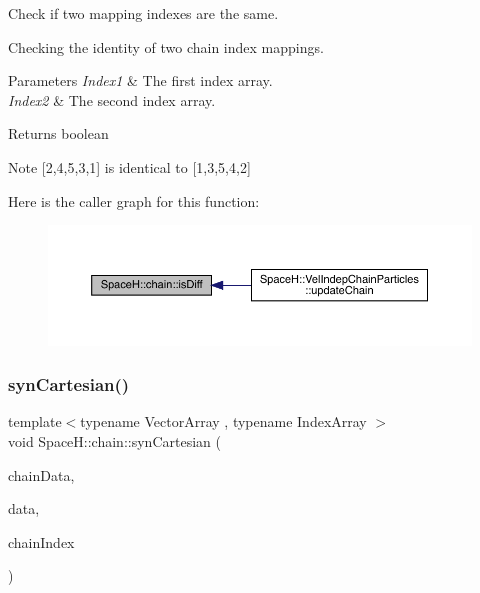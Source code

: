 Check if two mapping indexes are the same. 

Checking the identity of two chain index mappings. 
\begin{DoxyParams}{Parameters}
{\em Index1} & The first index array. \\
\hline
{\em Index2} & The second index array. \\
\hline
\end{DoxyParams}
\begin{DoxyReturn}{Returns}
boolean 
\end{DoxyReturn}
\begin{DoxyNote}{Note}
\mbox{[}2,4,5,3,1\mbox{]} is identical to \mbox{[}1,3,5,4,2\mbox{]} 
\end{DoxyNote}
Here is the caller graph for this function\+:
\nopagebreak
\begin{figure}[H]
\begin{center}
\leavevmode
\includegraphics[width=350pt]{namespace_space_h_1_1chain_ab54ce920a542c01625ee7d6c625cc5c4_icgraph}
\end{center}
\end{figure}
\mbox{\label{namespace_space_h_1_1chain_a1ba7809b40a52959d0566753b1c2eaee}} 
\subsubsection{\texorpdfstring{syn\+Cartesian()}{synCartesian()}}
{\footnotesize\ttfamily template$<$typename Vector\+Array , typename Index\+Array $>$ \\
void Space\+H\+::chain\+::syn\+Cartesian (\begin{DoxyParamCaption}\item[{const Vector\+Array \&}]{chain\+Data,  }\item[{Vector\+Array \&}]{data,  }\item[{const Index\+Array \&}]{chain\+Index }\end{DoxyParamCaption})}




